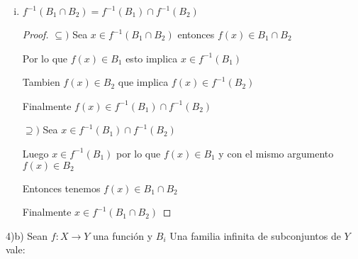 \documentclass[12pt]{article}
\newcommand{\ra}{\rightarrow}
\theoremstyle{definition}
\begin{document}
\begin{enumerate}[i.]
\begin{proof}
        $\supseteq )$ Sea $x \in f^{-1}(B_{1}) \cup f^{1}(B_{2})$

	Luego $x \in f^{-1}(B_{1})$ entonces $f(x) \in B_{1}$

	Por tanto $f(x) \in B_{1} \cup B_{2}$

	Finalmente $x \in f^{-1}(B_{1} \cup B_{2})$
      \end{proof}

    \item $f^{-1}(B_{1} \cap B_{2}) = f^{-1}(B_{1}) \cap f^{-1}(B_{2})$
      \begin{proof}
        $\subseteq )$ Sea $x \in f^{-1}(B_{1} \cap B_{2})$ entonces $f(x) \in B_{1} \cap B_{2}$

	Por lo que $f(x) \in B_{1}$ esto implica $x \in f^{-1}(B_{1})$

	Tambien $f(x) \in B_{2}$ que implica $f(x) \in f^{-1}(B_{2})$

	Finalmente $f(x) \in f^{-1}(B_{1}) \cap f^{-1}(B_{2})$

        $\supseteq )$ Sea $x \in f^{-1}(B_{1}) \cap f^{-1}(B_{2})$

        Luego $x \in f^{-1}(B_{1})$ por lo que $f(x) \in B_{1}$ y con el mismo argumento $f(x) \in B_{2}$

	Entonces tenemos $f(x) \in B_{1} \cap B_{2} $

        Finalmente $x \in f^{-1}(B_{1} \cap B_{2})$
      \end{proof}
 \end{enumerate}

4)b) Sean $f: X \ra Y$ una función y $B_{i}$ Una familia infinita de subconjuntos de $Y$ vale:
\end{document}
